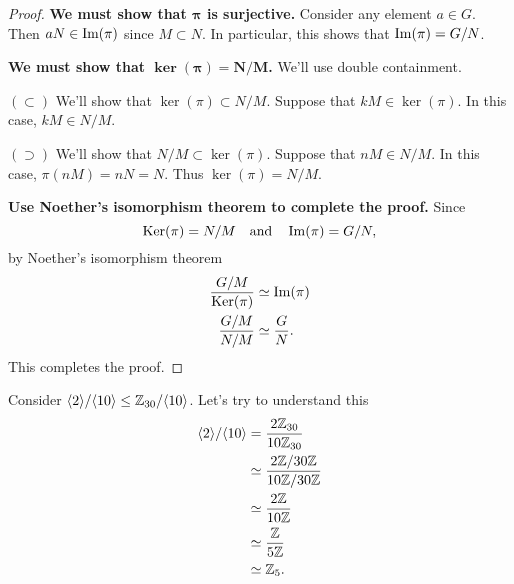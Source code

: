 \documentclass{ximera}
\begin{document}
\begin{theorem}
\begin{proof}
    \textbf{We must show that $\boldsymbol{\pi}$ is surjective.}
    Consider any element $a\in G$. Then $aN\in \operatorname{Im}(\pi)$ since
    $M\subset N$. In particular, this shows that $\operatorname{Im}(\pi) = G/N$.

    
    \textbf{We must show that $\boldsymbol{\ker(\pi)=N/M}$.} We'll use
    double containment.

    $(\subset)$ We'll show that $\ker(\pi)\subset N/M$.  Suppose that
    $kM\in\ker(\pi)$. In this case, $kM\in N/M$.
    

    $(\supset)$ We'll show that $N/M\subset \ker(\pi)$. Suppose that
    $nM\in N/M$. In this case, $\pi(nM) = nN = N$. Thus
    $\ker(\pi)=N/M$.


    \textbf{Use Noether's isomorphism theorem to complete the proof.} Since
    \[
    \mathop{\mathrm{Ker}}\nolimits(\pi) = N/M\quad\text{and}\quad\operatorname{Im}(\pi) = G/N,
    \]
    by Noether's isomorphism theorem
    \begin{align*}
    \frac{G/M}{\mathop{\mathrm{Ker}}\nolimits(\pi)} &\simeq \operatorname{Im}(\pi)\\
    \frac{G/M}{N/M} &\simeq \frac{G}{N}.
    \end{align*}
    This completes the proof.
  \end{proof}
\end{theorem}

\begin{example}
  Consider $\langle2\rangle/\langle10\rangle\leq \mathbb Z_{30}/\langle10\rangle$. Let's try to
  understand this
  \begin{align*}
    \langle2\rangle/\langle10\rangle &= \frac{2\mathbb Z_{30}}{10\mathbb Z_{30}}\\
    &\simeq \frac{2\mathbb Z/30\mathbb Z}{10\mathbb Z/30\mathbb Z}\\
    &\simeq \frac{2\mathbb Z}{10\mathbb Z}\\
    &\simeq \frac{\mathbb Z}{5\mathbb Z}\\
    &\simeq \mathbb Z_5.
  \end{align*}
\end{example}
\end{document}
